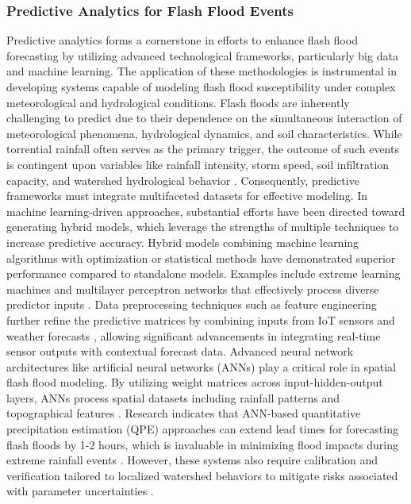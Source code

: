 \subsubsection{Predictive Analytics for Flash Flood Events}
Predictive analytics forms a cornerstone in efforts to enhance flash flood forecasting by utilizing advanced technological frameworks, particularly big data and machine learning. The application of these methodologies is instrumental in developing systems capable of modeling flash flood susceptibility under complex meteorological and hydrological conditions. Flash floods are inherently challenging to predict due to their dependence on the simultaneous interaction of meteorological phenomena, hydrological dynamics, and soil characteristics. While torrential rainfall often serves as the primary trigger, the outcome of such events is contingent upon variables like rainfall intensity, storm speed, soil infiltration capacity, and watershed hydrological behavior \citep{Beilicci2024}. Consequently, predictive frameworks must integrate multifaceted datasets for effective modeling.
In machine learning-driven approaches, substantial efforts have been directed toward generating hybrid models, which leverage the strengths of multiple techniques to increase predictive accuracy. Hybrid models combining machine learning algorithms with optimization or statistical methods have demonstrated superior performance compared to standalone models. Examples include extreme learning machines and multilayer perceptron networks that effectively process diverse predictor inputs \citep{Hinge2024}. Data preprocessing techniques such as feature engineering further refine the predictive matrices by combining inputs from IoT sensors and weather forecasts \citep{Msigwa2024}, allowing significant advancements in integrating real-time sensor outputs with contextual forecast data.
Advanced neural network architectures like artificial neural networks (ANNs) play a critical role in spatial flash flood modeling. By utilizing weight matrices across input-hidden-output layers, ANNs process spatial datasets including rainfall patterns and topographical features \citep{Ngo2018}. Research indicates that ANN-based quantitative precipitation estimation (QPE) approaches can extend lead times for forecasting flash floods by 1-2 hours, which is invaluable in minimizing flood impacts during extreme rainfall events \citep{Maqtan2022a}. However, these systems also require calibration and verification tailored to localized watershed behaviors to mitigate risks associated with parameter uncertainties \citep{Douinot2016}.
